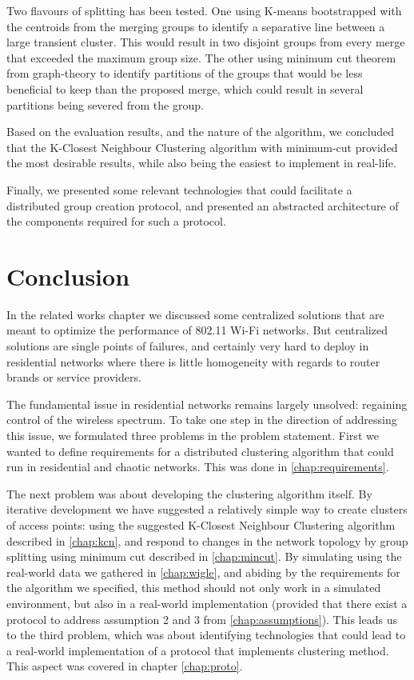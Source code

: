 Two flavours of splitting has been tested. One using K-means bootstrapped with the centroids from the merging groups to identify a separative line between a large transient cluster. This would result in
two disjoint groups from every merge that exceeded the maximum group size. The other using minimum cut theorem from graph-theory to identify partitions of the groups that would be less beneficial to keep than the proposed merge, which could result in several partitions being severed from the group. 

Based on the evaluation results, and the nature of the algorithm, we concluded that the K-Closest Neighbour Clustering algorithm with minimum-cut provided the most desirable results, while
also being the easiest to implement in real-life. 

Finally, we presented some relevant technologies that could facilitate a distributed group creation protocol, and presented an abstracted architecture of the components required for such a protocol.

\section{Conclusion}
In the related works chapter we discussed some centralized solutions that are meant 
to optimize the performance of 802.11 Wi-Fi networks. But centralized solutions are single points of failures, and certainly very hard to deploy in residential networks where there
is little homogeneity with regards to router brands or service providers. 

The fundamental issue in residential networks remains largely unsolved: regaining control of the wireless spectrum. To take one step in the direction of addressing this issue,
we formulated three problems in the problem statement. First we wanted to define requirements for a distributed clustering algorithm that could run in residential and chaotic networks.
This was done in \ref{chap:requirements}.

The next problem was about developing the clustering algorithm itself. By iterative development we have suggested a relatively simple way to create clusters of access points: using the suggested K-Closest Neighbour Clustering algorithm described in \ref{chap:kcn}, and respond to changes in the network topology by group splitting using minimum cut described in \ref{chap:mincut}. By simulating using the real-world data we gathered in \ref{chap:wigle}, and abiding by the requirements for the algorithm we specified, this method should not only work in a simulated environment, but also in a real-world implementation (provided that there exist a protocol to address assumption 2 and 3 from \ref{chap:assumptions}). This leads us to the third problem, which was about identifying
technologies that could lead to a real-world implementation of a protocol that implements clustering method. This aspect was covered in chapter \ref{chap:proto}.

